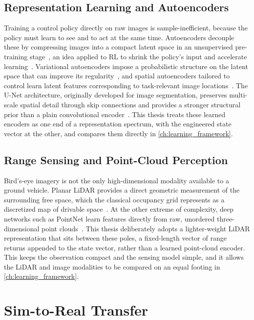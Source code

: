 \subsection{Representation Learning and Autoencoders}
Training a control policy directly on raw images is sample-inefficient, because the policy must learn to see and to act at the same time. Autoencoders decouple these by compressing images into a compact latent space in an unsupervised pre-training stage~\cite{hinton2006reducing}, an idea applied to RL to shrink the policy's input and accelerate learning~\cite{lange2010deep}. Variational autoencoders impose a probabilistic structure on the latent space that can improve its regularity~\cite{kingma2014vae}, and spatial autoencoders tailored to control learn latent features corresponding to task-relevant image locations~\cite{finn2016spatial}. The U-Net architecture, originally developed for image segmentation, preserves multi-scale spatial detail through skip connections and provides a stronger structural prior than a plain convolutional encoder~\cite{ronneberger2015unet}. This thesis treats these learned encoders as one end of a representation spectrum, with the engineered state vector at the other, and compares them directly in \cref{ch:learning_framework}.

\subsection{Range Sensing and Point-Cloud Perception}
Bird's-eye imagery is not the only high-dimensional modality available to a ground vehicle. Planar LiDAR provides a direct geometric measurement of the surrounding free space, which the classical occupancy grid represents as a discretized map of drivable space~\cite{elfes1989occupancy}. At the other extreme of complexity, deep networks such as PointNet learn features directly from raw, unordered three-dimensional point clouds~\cite{qi2017pointnet}. This thesis deliberately adopts a lighter-weight LiDAR representation that sits between these poles, a fixed-length vector of range returns appended to the state vector, rather than a learned point-cloud encoder. This keeps the observation compact and the sensing model simple, and it allows the LiDAR and image modalities to be compared on an equal footing in \cref{ch:learning_framework}.

\section{Sim-to-Real Transfer}

